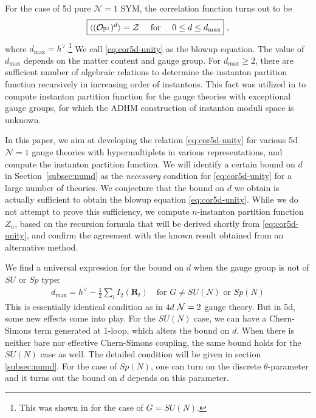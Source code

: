 \documentclass[letterpaper, 11pt]{article}
\def\IP{\mathbb{P}}
\def\CN{{\cal N}}
\def\CZ{{\cal Z}}
\begin{document}
For the case of 5d pure $\mathcal{N}=1$ SYM, the correlation function turns out to be  
\begin{align}
  \label{eq:cor5d-unity}
\boxed{  \langle (\mathcal{O}_{\IP^1})^{d}\rangle = \CZ \quad \text{ for }\quad 0\leq d \leq d_\text{max} } \ , 
\end{align}
where $d_\text{max} = h^\vee$.\footnote{This was shown in \cite{Nakajima:2005fg} for the case of $G=SU(N)$.} We call \eqref{eq:cor5d-unity} as the blowup equation. The value of $d_{\text{max}}$ depends on the matter content and gauge group. For $d_\text{max} \geq 2$, there are sufficient number of algebraic relations to determine the instanton partition function recursively in increasing order of instantons. This fact was utilized in \cite{Keller:2012da} to compute instanton partition function for the gauge theories with exceptional gauge groups, for which the ADHM construction of instanton moduli space is unknown. 

In this paper, we aim at developing the relation \eqref{eq:cor5d-unity} for various 5d 
$\mathcal{N}=1$ gauge theories with hypermultiplets in various representations, and compute the instanton partition function. We will identify a certain bound on $d$ in Section~\ref{subsec:numd} as the \emph{necessary} condition for \eqref{eq:cor5d-unity} for a large number of theories. 
We conjecture that the bound on $d$ we obtain is actually sufficient to obtain the blowup equation \eqref{eq:cor5d-unity}. While we do not attempt to prove this sufficiency, we compute $n$-instanton partition function $Z_n$, based on the recursion formula that will be derived shortly from \eqref{eq:cor5d-unity}, and confirm the agreement with the known result obtained from an alternative method.

We find a universal expression for the bound on $d$ when the gauge group is not of $SU$ or $Sp$ type:
\begin{align}
  \label{eq:cor5d-dmax}
 d_{\textrm{max}} =  h^\vee -\frac{1}{2}\sum_l I_2(\mathbf{R}_l) \quad \textrm{for } G \neq SU(N) \textrm{ or } Sp(N) 
\end{align}
This is essentially identical condition as in $4d$ $\CN=2$ gauge theory. But in 5d, some new effects come into play. 
For the $SU(N)$ case, we can have a Chern-Simons term generated at 1-loop, which alters the bound on $d$. When there is neither bare nor effective Chern-Simons coupling, the same bound holds for the $SU(N)$ case as well. The detailed condition will be given in section \ref{subsec:numd}. For the case of $Sp(N)$, one can turn on the discrete $\theta$-parameter and it turns out the bound on $d$ depends on this parameter. 
\end{document}
